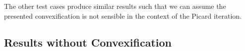 The other test cases produce similar results such that we can assume the presented convexification is not sensible in the context of the Picard iteration.



	

\subsection{Results without Convexification}

